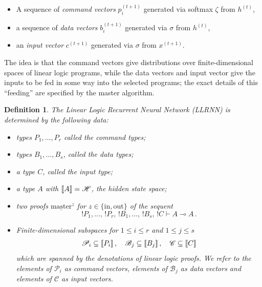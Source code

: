 \documentclass[english,letter paper,12pt,leqno]{article}
\theoremstyle{example}
\newtheorem{definition}[theorem]{Definition}
\numberwithin{equation}{section}
\def\be{\begin{equation}}
\def\ee{\end{equation}}
\begin{document}

\begin{itemize}
\item A sequence of \emph{command vectors} $p_i^{(t+1)}$ generated via softmax $\zeta$ from $h^{(t)}$,
\item a sequence of \emph{data vectors} $b_i^{(t+1)}$ generated via $\sigma$ from $h^{(t)}$,
\item an \emph{input vector} $c^{(t+1)}$ generated via $\sigma$ from $x^{(t+1)}$.
\end{itemize}
The idea is that the command vectors give distributions over finite-dimensional spaces of linear logic programs, while the data vectors and input vector give the inputs to be fed in some way into the selected programs; the exact details of this ``feeding'' are specified by the master algorithm. 

\begin{definition} The Linear Logic Recurrent Neural Network (LLRNN) is determined by the following data:
\begin{itemize}
\item types $P_1,\ldots,P_r$ called the \emph{command types};
\item types $B_1,\ldots,B_s$, called the \emph{data types};
\item a type $C$, called the \emph{input type};
\item a type $A$ with $\llbracket A \rrbracket = \mathscr{H}$, the hidden state space;
\item two proofs $\underline{\mathrm{master}}^z$ for $z \in \{\mathrm{in},\mathrm{out}\}$ of the sequent
\be
{!} P_1, \ldots, \, {!}P_r,\, {!} B_1, \ldots,\, {!} B_s,\, {!} C \vdash A \multimap A\,.
\ee
\item Finite-dimensional subspaces for $1 \le i \le r$ and $1 \le j \le s$
\be
\mathscr{P}_i \subseteq \den{P_i}\,, \quad \mathscr{B}_j \subseteq \den{B_j}\,, \quad \mathscr{C} \subseteq \den{C}
\ee
which are spanned by the denotations of linear logic proofs. We refer to the elements of $\mathscr{P}_i$ as \emph{command vectors}, elements of $\mathscr{B}_j$ as \emph{data vectors} and elements of $\mathscr{C}$ as \emph{input vectors}.
\end{itemize}
\end{definition}
\end{document}
